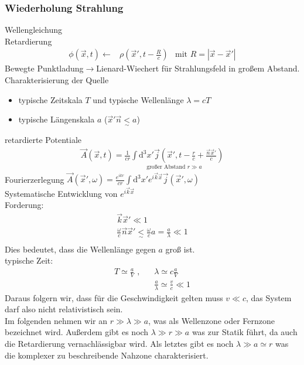 \documentclass[a4paper]{article}
\begin{document}
\subsubsection{Wiederholung Strahlung}
Wellengleichung\\
Retardierung
\begin{align}
\phi(\vec{x},t)\longleftarrow&\rho(\vec{x}',t-\frac{R}{c})
&\text{mit }R=|\vec{x}-\vec{x}'| 
\end{align}
Bewegte Punktladung$\rightarrow$Lienard-Wiechert für Strahlungsfeld in großem
Abstand.\\
Charakterisierung der Quelle\\
\begin{itemize}
  \item typische Zeitskala $T$ und typische Wellenlänge $\lambda=cT$
  \item typische Längenskala $a$ ($\vec{x}'\vec{n}\underset{\sim}{<}a$)
\end{itemize}
retardierte Potentiale
\begin{align}
\vec{A}(\vec{x},t)=\underset{\text{großer Abstand } r\gg a}{
\frac{1}{cr}\int\mathrm{d}^3x'
\vec{j}(\vec{x}',t-\frac{r}{c}+\frac{\vec{n}\vec{x}'}{c})} 
\end{align}
Fourierzerlegung
$\vec{A}(\vec{x}',\omega)=\frac{e^{ikr}}{cr}\int\mathrm{d}^3x'e^{i\vec{k}\vec{x}}\vec{j}(\vec{x}',\omega)$\\
Systematische Entwicklung von $e^{i\vec{k}\vec{x}}$\\
Forderung: \begin{align}
\vec{k}\vec{x}'\ll1\\
\frac{\omega}{c}\vec{n}\vec{x}'\underset{\sim}{<}\frac{\omega}{c}a=\frac{a}{\lambda}\ll1\\
\end{align}
Dies bedeutet, dass die Wellenlänge gegen $a$ groß ist.\\
typische Zeit:
\begin{align}
T\simeq \frac{a}{V}\text{ , }\ \ \ &\lambda\simeq c\frac{a}{V}\\
&\frac{a}{\lambda}\simeq\frac{v}{c}\ll1
\end{align}
Daraus folgern wir, dass für die Geschwindigkeit gelten muss $v\ll c$, das
System darf also nicht relativistisch sein.\\
Im folgenden nehmen wir an $r\gg\lambda\gg a$, was als Wellenzone oder Fernzone
bezeichnet wird. Außerdem gibt es noch $\lambda\gg r\gg a$ was zur Statik führt,
da auch die Retardierung vernachlässigbar wird. Als letztes gibt es noch
$\lambda \gg a \simeq r$ was die komplexer zu beschreibende Nahzone
charakterisiert.\\
\end{document}
